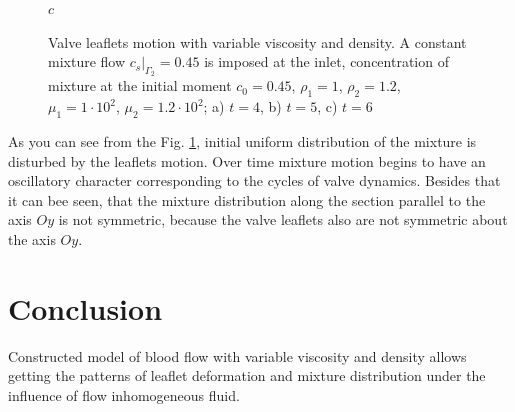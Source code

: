 \documentclass[runningheads,a4paper]{llncs}
\begin{document}
\begin{figure}
$c$

\caption{Valve leaflets motion with variable viscosity and density. A constant mixture flow $c_s|_{\Gamma_2} = 0.45$ is imposed at the inlet,
concentration of mixture at the initial moment $c_0 = 0.45$, $\rho_1=1$, $\rho_2=1.2$, $\mu_1 = 1 \cdot 10^2$, $\mu_2 = 1.2 \cdot 10^2$;
a) $t = 4$, b) $t=5$, c) $t=6$}
\label{fig:valve_in_mixture}
\end{figure}

As you can see from the Fig. \ref{fig:valve_in_mixture}, initial uniform distribution of the mixture is disturbed by the leaflets motion. Over time
mixture motion begins to have an oscillatory character corresponding to the cycles of valve dynamics. Besides that it can bee seen,
that the mixture distribution along the section parallel to the axis $Oy$ is not symmetric, because the valve leaflets also are not symmetric about the axis $Oy$.

\section{Conclusion}

Constructed model of blood flow with variable viscosity and density allows getting the patterns of leaflet deformation and mixture distribution 
under the influence of flow inhomogeneous fluid.
\end{document}
